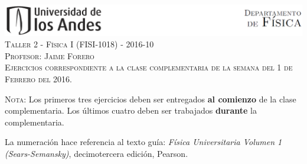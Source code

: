 \documentclass[letterpaper,10pt,onecolumn]{article}
\begin{document}
\begin{center}


\includegraphics[width=490pt]{header.png}\\[0.5cm]

\textsc{\LARGE Taller 2 - F\'isica I (FISI-1018) - 2016-10}\\[0.5cm]

\textsc{\Large{Profesor: Jaime Forero}} \\[0.5cm]

\noindent\textsc{Ejercicios correspondiente a la clase complementaria
  de la semana del 1 de Febrero del 2016.}\\[0.5cm]
\end{center}

\noindent\textsc{Nota:} 
Los primeros tres ejercicios deben ser
entregados {\bf al comienzo} de la clase complementaria. Los \'ultimos
cuatro deben ser trabajados {\bf durante} la complementaria. 

La numeraci\'on
hace referencia al texto gu\'ia: \textit{F\'isica Universitaria Volumen
  1 (Sears-Semansky)}, decimotercera edici\'on, Pearson.
\end{document}
